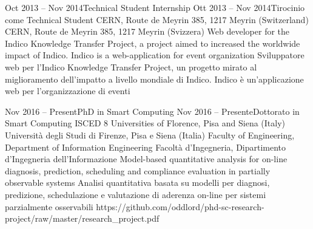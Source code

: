 \begin{europasscv}
      \job
      {Oct 2013 -- Nov 2014}{Technical Student Internship}
      {Ott 2013 -- Nov 2014}{Tirocinio come Technical Student}
        \jobLocation
          {CERN, Route de Meyrin 385, 1217 Meyrin (Switzerland)}
          {CERN, Route de Meyrin 385, 1217 Meyrin (Svizzera)}
        \jobDescription
          {Web developer for the Indico Knowledge Transfer Project, a project aimed to increased the worldwide impact of Indico. Indico is a web-application for event organization}
          {Sviluppatore web per l'Indico Knowledge Transfer Project, un progetto mirato al miglioramento dell'impatto a livello mondiale di Indico. Indico è un'applicazione web per l'organizzazione di eventi}
    
    \educationAndTraining
    
      \school
      {Nov 2016 -- Present}{PhD in Smart Computing}
      {Nov 2016 -- Presente}{Dottorato in Smart Computing}
      {ISCED 8}
        \schoolLocation
          {Universities of Florence, Pisa and Siena (Italy)}
          {Università degli Studi di Firenze, Pisa e Siena (Italia)}
        \schoolFaculty
          {Faculty of Engineering, Department of Information Engineering}
          {Facoltà d'Ingegneria, Dipartimento d'Ingegneria dell'Informazione}
        \thesisURL
          {Model-based quantitative analysis for on-line diagnosis, prediction, scheduling and compliance evaluation in partially observable systems}
          {Analisi quantitativa basata su modelli per diagnosi, predizione, schedulazione e valutazione di aderenza on-line per sistemi parzialmente osservabili}
          {https://github.com/oddlord/phd-sc-research-project/raw/master/research_project.pdf}


\end{europasscv}
